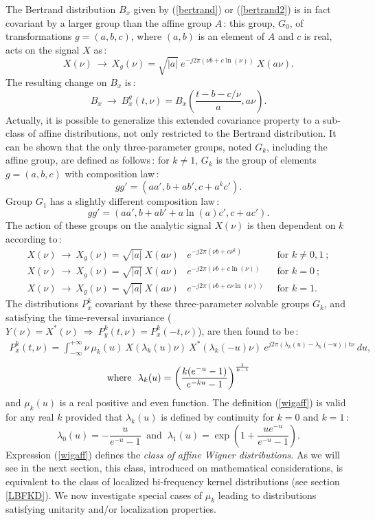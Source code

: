   The Bertrand distribution $B_x$ given by (\ref{bertrand}) or
(\ref{bertrand2}) is in fact covariant by a larger group than the affine
group $A$\,: this group, $G_0$, of transformations $g=(a,b,c)$, where $(a,b)$
is an element of $A$ and $c$ is real, acts on the signal $X$ as\,:
\[X(\nu)\ \rightarrow\  X_g(\nu) = \sqrt{|a|}\ e^{-j2\pi(\nu b+c \ln(\nu))}\
X(a\nu).\] 
The resulting change on $B_x$ is\,:
\[B_x\ \rightarrow\ B_x^g(t,\nu)=B_x\left(\frac{t-b-c/\nu}{a},a\nu\right).\]
Actually, it is possible to generalize this extended covariance property to
a sub-class of affine distributions, not only restricted to the Bertrand
distribution. It can be shown that the only three-parameter groups, noted
$G_k$, including the affine group, are defined as follows\,: for $k\neq1$,
$G_k$ is the group of elements $g=(a,b,c)$ with composition law\,:
\[gg'=(a a',b+a b',c+a^k c').\]
Group $G_1$ has a slightly different composition law\,:
\[gg'=(a a',b+a b'+a \ln(a) c',c+a c').\]
The action of these groups on the analytic signal $X(\nu)$ is then dependent
on $k$ according to\,:
\begin{eqnarray*}
X(\nu)\ \rightarrow\ X_g(\nu)=\sqrt{|a|}\ X(a\nu) & e^{-j2\pi(\nu
b+c\nu^k)}\  &\mbox{ for } k\neq 0,1\ ;\\
X(\nu)\ \rightarrow\ X_g(\nu)=\sqrt{|a|}\ X(a\nu) & e^{-j2\pi(\nu b+c
\ln(\nu))}\  &\mbox{ for } k=0\ ;\\
X(\nu)\ \rightarrow\ X_g(\nu)=\sqrt{|a|}\ X(a\nu) & e^{-j2\pi(\nu b+c\nu
\ln(\nu))}\  &\mbox{ for } k=1.
\end{eqnarray*}
The distributions $P_x^k$ covariant by these three-parameter solvable
groups $G_k$, and satisfying the time-reversal invariance
($Y(\nu)=X^*(\nu)\ \Rightarrow\ P_y^k(t,\nu)=P_x^k(-t,\nu)$), are then
found to be\,:
\begin{eqnarray}
\label{wigaff}
P_x^k(t,\nu)=\int_{-\infty}^{+\infty}\nu\ \mu_k(u)\ X(\lambda_k(u)\nu)\
X^*(\lambda_k(-u)\nu)\ e^{j2\pi(\lambda_k(u)-\lambda_k(-u))t\nu}\ du,      
\end{eqnarray}
\[\mbox{where }\
\lambda_k(u)=\left({k(e^{-u}-1)\over e^{-ku}-1}\right)^{\frac{1}{k-1}}\]
and $\mu_k(u)$ is a real positive and even function. The definition
(\ref{wigaff}) is valid for any real $k$ provided that $\lambda_k(u)$ is
defined by continuity for $k=0$ and $k=1$\,:
\[\lambda_0(u)=-\frac{u}{e^{-u}-1} \ \mbox{ and }\
  \lambda_1(u)=\exp\left(1+\frac{ue^{-u}}{e^{-u}-1}\right). \] Expression
(\ref{wigaff}) defines the {\it class of affine Wigner distributions}. As
we will see in the next section, this class, introduced on mathematical
considerations, is equivalent to the class of localized bi-frequency kernel
distributions (see section \ref{LBFKD}). We now investigate special cases of
$\mu_k$ leading to distributions satisfying unitarity and/or localization
properties.


